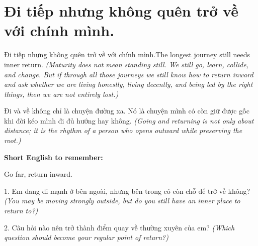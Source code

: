 \section{Đi tiếp nhưng không quên trở về với chính mình.}
\begin{truyen}{Đi tiếp nhưng không quên trở về với chính mình.}{The longest journey still needs inner return.}
\textit{(Maturity does not mean standing still. We still go, learn, collide, and change. But if through all those journeys we still know how to return inward and ask whether we are living honestly, living decently, and being led by the right things, then we are not entirely lost.)}
\end{truyen}
\begin{baihoc}
Đi và về không chỉ là chuyện đường xa. Nó là chuyện mình có còn giữ được gốc khi đời kéo mình đi đủ hướng hay không.
\textit{(Going and returning is not only about distance; it is the rhythm of a person who opens outward while preserving the root.)}
\end{baihoc}
\begin{ghinhoanh}
\textbf{Short English to remember:}

Go far, return inward.
\end{ghinhoanh}
\begin{tuhocnhanh}
1. Em đang đi mạnh ở bên ngoài, nhưng bên trong có còn chỗ để trở về không? \textit{(You may be moving strongly outside, but do you still have an inner place to return to?)}

2. Câu hỏi nào nên trở thành điểm quay về thường xuyên của em? \textit{(Which question should become your regular point of return?)}
\end{tuhocnhanh}
\ngancach

